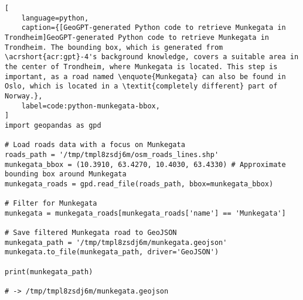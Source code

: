 \begin{lstlisting}[
    language=python,
    caption={[GeoGPT-generated Python code to retrieve Munkegata in Trondheim]GeoGPT-generated Python code to retrieve Munkegata in Trondheim. The bounding box, which is generated from \acrshort{acr:gpt}-4's background knowledge, covers a suitable area in the center of Trondheim, where Munkegata is located. This step is important, as a road named \enquote{Munkegata} can also be found in Oslo, which is located in a \textit{completely different} part of Norway.},
    label=code:python-munkegata-bbox,
]
import geopandas as gpd

# Load roads data with a focus on Munkegata
roads_path = '/tmp/tmpl8zsdj6m/osm_roads_lines.shp'
munkegata_bbox = (10.3910, 63.4270, 10.4030, 63.4330) # Approximate bounding box around Munkegata
munkegata_roads = gpd.read_file(roads_path, bbox=munkegata_bbox)

# Filter for Munkegata
munkegata = munkegata_roads[munkegata_roads['name'] == 'Munkegata']

# Save filtered Munkegata road to GeoJSON
munkegata_path = '/tmp/tmpl8zsdj6m/munkegata.geojson'
munkegata.to_file(munkegata_path, driver='GeoJSON')

print(munkegata_path)

# -> /tmp/tmpl8zsdj6m/munkegata.geojson
\end{lstlisting}

\FloatBarrier
\newpage

